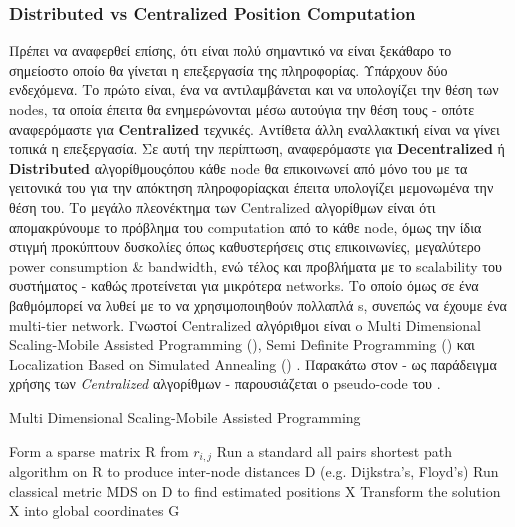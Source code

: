 \subsubsection{Distributed vs Centralized Position Computation}
Πρέπει να αναφερθεί επίσης, ότι είναι πολύ σημαντικό να είναι ξεκάθαρο το σημείο\udot στο οποίο
θα γίνεται η επεξεργασία της πληροφορίας. Υπάρχουν δύο ενδεχόμενα. Το πρώτο
είναι, ένα  να αντιλαμβάνεται και να υπολογίζει την θέση των nodes, τα οποία
έπειτα θα ενημερώνονται μέσω αυτού\udot για την θέση τους - οπότε αναφερόμαστε για \textbf{Centralized} τεχνικές. Αντίθετα άλλη εναλλακτική 
είναι να γίνει τοπικά η επεξεργασία. Σε αυτή την περίπτωση, αναφερόμαστε για \textbf{Decentralized} ή \textbf{Distri\-bu\-ted} αλγορίθμους\udot όπου κάθε node θα 
επικοινωνεί από μόνο του με τα γειτονικά του για την απόκτηση πληροφορίας\udot και έπειτα υπολογίζει μεμονωμένα την θέση του. 
Το μεγάλο πλεονέκτημα των Centralized αλγορίθμων είναι ότι απομακρύνουμε το πρόβλημα του computation από το κάθε node, όμως την ίδια στιγμή
προκύπτουν δυσκολίες όπως καθυστερήσεις στις επικοινωνίες, μεγαλύτερο power consumption \& bandwidth, ενώ τέλος
και προβλήματα με το scalability του συστήματος - καθώς προτείνεται για μικρότερα networks. Το οποίο όμως σε ένα βαθμό\udot μπορεί να λυθεί
με το να χρησιμοποιηθούν πολλαπλά s, συνεπώς να έχουμε ένα multi-tier network.
Γνωστοί Centralized αλγόριθμοι είναι o Multi Dimensional Scaling-Mobile Assisted Programming (), 
Semi Definite Programming () και Localization Based on Simulated Annealing () \cite{range-distributed}.
Παρακάτω στον  - ως παράδειγμα
χρήσης των \emph{Centralized} αλγορίθμων - παρουσιάζεται ο pseudo-code του .

\begin{algorithm}[H]
	\caption[Multi Dimensional Scaling-Mobile Assisted Programming]{Multi Dimensional Scaling-Mobile Assisted Programming \cite{localization-algorithms}}\label{alg:MDS-MAP}
	\begin{algorithmic}[1]	%
			\State Form a sparse matrix R from $r_{i,j}$
			\State Run a standard all pairs shortest path algorithm on R to produce \newline inter-node distances D (e.g. Dijkstra's, Floyd's)
			\State Run classical metric MDS on D to find estimated positions X
			\State Transform the solution X into global coordinates G
	\end{algorithmic}
\end{algorithm}

